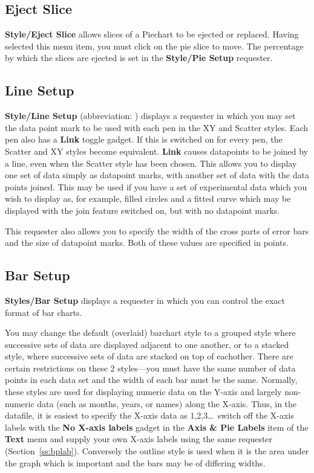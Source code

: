 \subsection{Eject Slice}
{\bf Style/Eject Slice} allows slices of a Piechart to be 
ejected or replaced. 
Having selected this menu item, you must click on the pie slice to move. The 
percentage by which the slices are ejected is set in the {\bf Style/Pie Setup} 
requester.

\subsection{Line Setup}
\label{ss:dp}
{\bf Style/Line Setup}  (abbreviation: ) displays a 
requester in which you may set the data point mark 
to be used with each pen in the XY and Scatter styles. Each pen also has a {\bf Link}
toggle gadget. If this is switched on for every pen, the Scatter and XY styles become 
equivalent. {\bf Link} causes datapoints to be joined by a line, even 
when the Scatter 
style has been chosen. This allows you to display one set of data simply as 
datapoint marks, with another set of data with the data points joined. This may 
be used if you have a set of experimental data which you wish to display as, for 
example, filled circles and a fitted curve which may be displayed with the join 
feature switched on, but with no datapoint marks. 

This requester also allows you to specify the width of the cross parts of error 
bars and the size of datapoint marks. Both of these values are specified in points.

\subsection{Bar Setup}
\label{ss:barstyle}
{\bf Styles/Bar Setup}  displays a requester in which 
you can control the exact format of bar charts.

You may change the default (overlaid) barchart style to a grouped style 
 where successive sets of data are displayed adjacent to one 
another, or to a stacked style, where successive sets of data are stacked on top 
of eachother. There are certain restrictions on these 2 styles---you must have the 
same number of data points in each data set and the width of each bar must be the 
same. Normally, these styles are used for displaying numeric data on the Y-axis and 
largely non-numeric data (such as months, years, or names) along the X-axis. 
Thus, in the datafile, it is easiest to specify the X-axis data as 1,2,3\ldots\ 
switch off the X-axis labels with the {\bf No X-axis labels} gadget in the 
{\bf Axis \& Pie Labels} item of the {\bf Text} menu and supply your own X-axis 
labels using the same requester (Section~\ref{ss:bplab}).
Conversely the outline style  is used when it is the area under 
the graph which is important and the bars may be of differing widths.

